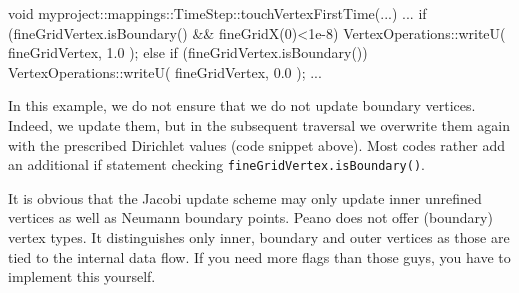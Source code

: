 \begin{code}
void myproject::mappings::TimeStep::touchVertexFirstTime(...) {
  ...
  if (fineGridVertex.isBoundary() && fineGridX(0)<1e-8) {
    VertexOperations::writeU( fineGridVertex, 1.0 );
  }
  else if (fineGridVertex.isBoundary()) {
    VertexOperations::writeU( fineGridVertex, 0.0 );
  }
  ...
}
\end{code}

\begin{remark}
In this example, we do not ensure that we do not update boundary vertices.
Indeed, we update them, but in the subsequent traversal we overwrite them again
with the prescribed Dirichlet values (code snippet above). Most codes rather add
an additional if statement checking \texttt{fineGridVertex.isBoundary()}.
\end{remark}


    \begin{remark}
    It is obvious that the Jacobi update scheme may only update inner
    unrefined vertices as well as Neumann boundary points. Peano does not offer
    (boundary) vertex types. It distinguishes only inner, boundary and outer
    vertices as those are tied to the internal data flow.
    If you need more flags than those guys, you have to implement this yourself.
    \end{remark}



